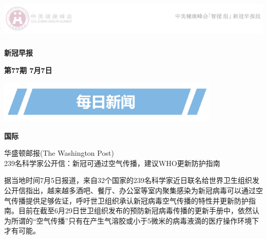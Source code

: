 \documentclass[]{article}
\author{}
\date{\vspace{-2.5em}}
\begin{document}
 \fontsize{22}{22}
\selectfont
\vspace{-10truemm}

\newcommand{\resheading}[1]{%
  \noindent\fcolorbox{lavenderblush}{lavenderblush}{\makebox[\dimexpr\textwidth-2\fboxsep-2\fboxrule][c]{\textbf{~#1}}}%
}

\begin{center}
\includegraphics[height=2cm]{./input/logo2.png} 
\end{center}

\begin{center}
\fontsize{45}{45}
\textcolor{glaucous}{\textbf{新冠早报}}
\end{center}

\begin{center}
\fontsize{22}{22}
{\textcolor{glaucous}{\textbf{第77期 \space 7月7日}}}
\end{center}

\vspace{2mm}

\begin{center}
\includegraphics[height=2cm]{./input/title1.png} 
\end{center}

\vspace{-5mm}

\begin{huge}{\textcolor{glaucous}{\textbf{国际}}}\end{huge}

\vspace{-3mm}

\begin{center}
\textcolor{glaucous}{华盛顿邮报(The Washington Post)}\\239名科学家公开信：新冠可通过空气传播，建议WHO更新防护指南

\end{center}

据当地时间7月5日报道，来自32个国家的239名科学家近日联名给世界卫生组织发公开信指出，越来越多酒吧、餐厅、办公室等室内聚集感染为新冠病毒可以通过空气传播提供足够佐证，呼吁世卫组织承认新冠病毒空气传播的特性并更新防护指南。目前在截至6月29日世卫组织发布的预防新冠病毒传播的更新手册中，依然认为所谓的``空气传播''只有在产生气溶胶或小于5微米的病毒液滴的医疗操作环境下才有可能。
\end{document}
